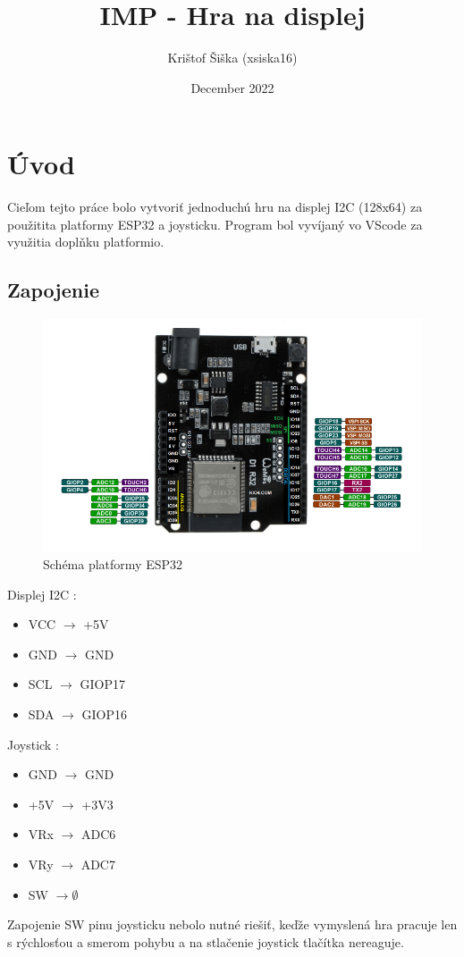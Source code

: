 \documentclass{article}
\title{IMP - Hra na displej}
\author{Krištof Šiška (xsiska16)}
\date{December 2022}
\begin{document}
\maketitle

\section{Úvod}
Cieľom tejto práce bolo vytvoriť jednoduchú hru na displej I2C (128x64) za použitita platformy ESP32 a joysticku. Program bol vyvíjaný vo VScode za využitia doplňku platformio.

\subsection{Zapojenie}
    \begin{figure}[h!]
        \centering
        \includegraphics[scale=0.8]{ESP32.png}
        \caption{Schéma platformy ESP32}
    \end{figure} 
Displej I2C : 

    \begin{itemize}
        \item VCC $ \rightarrow $ +5V 
        \item GND $ \rightarrow $ GND
        \item SCL $ \rightarrow $ GIOP17
        \item SDA $ \rightarrow $ GIOP16
 \end{itemize}   
Joystick :

    \begin{itemize}
        \item GND $ \rightarrow $ GND
        \item +5V $ \rightarrow $ +3V3
        \item VRx $ \rightarrow $ ADC6
        \item VRy $ \rightarrow $ ADC7
        \item SW $ \rightarrow \emptyset $ 
    \end{itemize}
Zapojenie SW pinu joysticku nebolo nutné riešiť, keďže vymyslená hra
pracuje len s rýchlosťou a smerom pohybu a na stlačenie joystick tlačítka
nereaguje.
\end{document}
